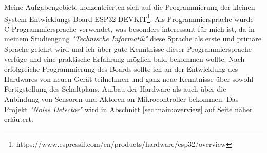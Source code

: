 Meine Aufgabengebiete konzentrierten sich auf die Programmierung der kleinen System-Entwicklungs-Board ESP32 DEVKIT\footnote{https://www.espressif.com/en/products/hardware/esp32/overview}. Als Programmiersprache wurde C-Programmiersprache verwendet, was besonders interessant für mich ist, da in meinem Studiengang \textit{"Technische Informatik"} diese Sprache als erste und primäre Sprache gelehrt wird und ich über gute Kenntnisse dieser Programmiersprache verfüge und eine praktische Erfahrung möglich bald bekommen wollte. Nach erfolgreiche Programmierung des Boards sollte ich an der Entwicklung des Hardwares von neuen Gerät teilnehmen und ganz neue Kenntnisse über sowohl Fertigstellung des Schaltplans, Aufbau der Hardware als auch über die Anbindung von Sensoren und Aktoren an Mikrocontroller bekommen.
Das Projekt \textit{"Noise Detector"} wird in Abschnitt \ref{sec:main:overview} auf Seite \pageref{sec:main:overview} näher erläutert.
